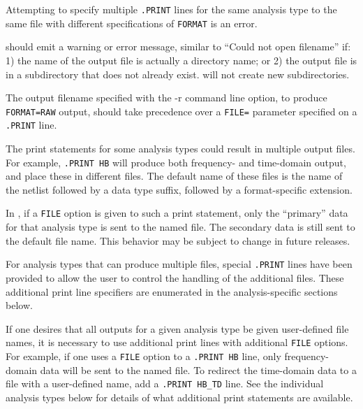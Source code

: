 \begin{Command}
\begin{XyceItemize}
\item Attempting to specify multiple \texttt{.PRINT} lines for the same
  analysis type to the same file with different specifications
  of \texttt{FORMAT} is an error.

\item \Xyce{} should emit a warning or error message, similar to 
  ``Could not open filename'' if: 1) the name of the output file is 
  actually a directory name; or 2) the output file is in a 
  subdirectory that does not already exist.  \Xyce{} 
  will not create new subdirectories.

\item The output filename specified with the -r command line option, 
  to produce {\tt FORMAT=RAW} output, should take precedence over 
  a {\tt FILE=} parameter specified on a {\tt .PRINT} line.

\item The print statements for some analysis types could result in multiple
  output files.  For example, \texttt{.PRINT HB} will produce both
  frequency- and time-domain output, and place these in different files.
  The default name of these files is the name of the netlist followed by
  a data type suffix, followed by a format-specific extension.

  In \Xyce{}, if a \texttt{FILE} option is given to such a print
  statement, only the ``primary'' data for that analysis type is sent to
  the named file.  The secondary data is still sent to the default file
  name.  This behavior may be subject to change in future releases.

  For analysis types that can produce multiple files,
  special \texttt{.PRINT} lines have been provided to allow the user to
  control the handling of the additional files.  These additional print
  line specifiers are enumerated in the analysis-specific sections
  below.

  If one desires that all outputs for a given analysis type be given
  user-defined file names, it is necessary to use additional print lines
  with additional \texttt{FILE} options.  For example, if one uses
  a \texttt{FILE} option to a \texttt{.PRINT HB} line, only
  frequency-domain data will be sent to the named file.  To redirect the
  time-domain data to a file with a user-defined name, add
  a \texttt{.PRINT HB\_TD} line.  See the individual analysis types
  below for details of what additional print statements are available.
\end{XyceItemize}

\end{Command}

